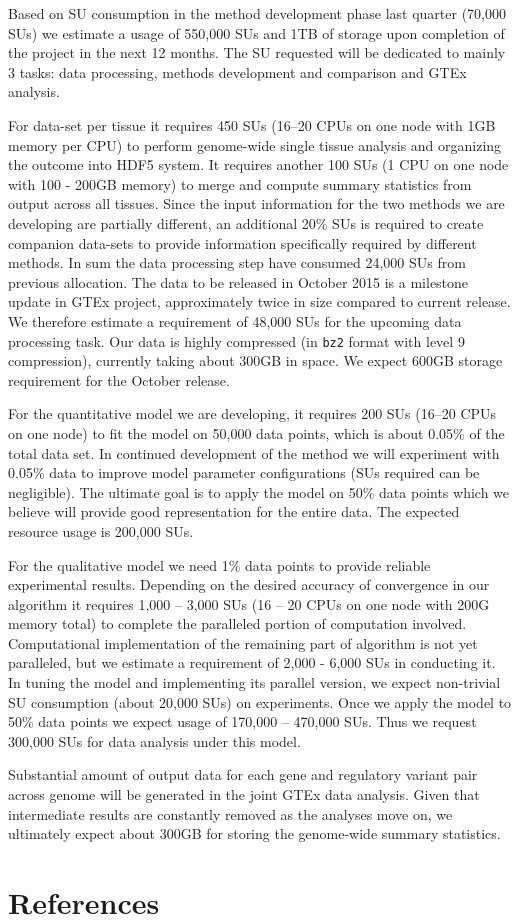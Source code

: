 \documentclass[10pt]{article}
\begin{document}
Based on SU consumption in the method development phase last quarter (70,000 SUs) we estimate a usage of 550,000 SUs and 1TB of storage upon completion of the project in the next 12 months. 
The SU requested will be dedicated to mainly 3 tasks: data processing, methods development and comparison and GTEx analysis.

For data-set per tissue it requires 450 SUs (16--20 CPUs on one node with 1GB memory per CPU) to perform genome-wide single tissue analysis and organizing the outcome into HDF5 system. 
It requires another 100 SUs (1 CPU on one node with 100 - 200GB memory) to merge and compute summary statistics from output across all tissues. 
Since the input information for the two methods we are developing are partially different, an additional 20\% SUs is required to create companion data-sets to provide information specifically required by different methods. 
In sum the data processing step have consumed 24,000 SUs from previous allocation. The data to be released in October 2015 is a milestone update in GTEx project, approximately twice in size compared to current release. 
We therefore estimate a requirement of 48,000 SUs for the upcoming data processing task. 
Our data is highly compressed (in \texttt{bz2} format with level 9 compression), currently taking about 300GB in space. We expect 600GB storage requirement for the October release.

For the quantitative model we are developing, it requires 200 SUs (16--20 CPUs on one node) to fit the model on 50,000 data points, which is about 0.05\% of the total data set. 
In continued development of the method we will experiment with 0.05\% data to improve model parameter configurations (SUs required can be negligible). 
The ultimate goal is to apply the model on 50\% data points which we believe will provide good representation for the entire data. 
The expected resource usage is 200,000 SUs.

For the qualitative model we need 1\% data points to provide reliable experimental results.
Depending on the desired accuracy of convergence in our algorithm it requires 1,000 -- 3,000 SUs (16 -- 20 CPUs on one node with 200G memory total) to complete the paralleled portion of computation involved.
Computational implementation of the remaining part of algorithm is not yet paralleled, but we estimate a requirement of 2,000 - 6,000 SUs in conducting it.
In tuning the model and implementing its parallel version, we expect non-trivial SU consumption (about 20,000 SUs) on experiments.
Once we apply the model to 50\% data points we expect usage of 170,000 -- 470,000 SUs.
Thus we request 300,000 SUs for data analysis under this model.

Substantial amount of output data for each gene and regulatory variant pair across genome will be generated in the joint GTEx data analysis. 
Given that intermediate results are constantly removed as the analyses move on, we ultimately expect about 300GB for storing the genome-wide summary statistics.

\section*{References}\label{references}
\end{document}
